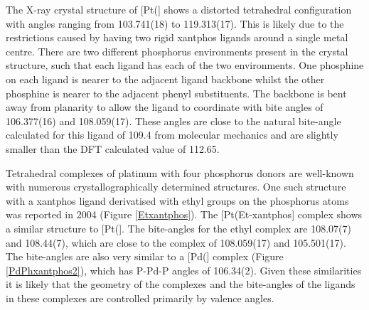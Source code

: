 The X-ray crystal structure of [Pt(\Phthixantphos{}] shows a distorted tetrahedral configuration with angles ranging from 103.741(18) to 119.313(17)\degrees.  This is likely due to the restrictions caused by having two rigid xantphos ligands around a single metal centre.  There are two different phosphorus environments present in the crystal structure, such that each ligand has each of the two environments.  One phosphine on each ligand is nearer to the adjacent ligand backbone whilst the other phosphine is nearer to the adjacent phenyl substituents.  The backbone is bent away from planarity to allow the ligand to coordinate with bite angles of 106.377(16) and 108.059(17)\degrees. These angles are close to the natural bite-angle calculated for this ligand of 109.4\degrees{} from molecular mechanics and are slightly smaller than the DFT calculated value of 112.65\degrees.\cite{Birkholz2009}

Tetrahedral complexes of platinum with four phosphorus donors are well-known with numerous crystallographically determined structures.\cite{Allen2002}  One such structure with a xantphos ligand derivatised with ethyl groups on the phosphorus atoms was reported in 2004 (Figure \ref{Etxantphos}).\cite{Miedaner2004}  The [Pt(Et-xantphos] complex shows a similar structure to [Pt(\Phthixantphos{}].  The bite-angles for the ethyl complex are 108.07(7) and 108.44(7)\degrees, which are close to the \Phthixantphos{} complex of 108.059(17) and 105.501(17)\degrees.  The bite-angles are also very similar to a [Pd(\Phxantphos{}] complex (Figure \ref{PdPhxantphos2}), which has P-Pd-P angles of 106.34(2)\degrees{}.\cite{Grushin2006} Given these similarities it is likely that the geometry of the complexes and the bite-angles of the ligands in these complexes are controlled primarily by valence angles. 



